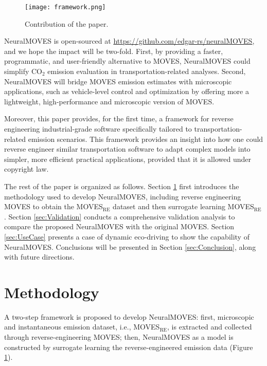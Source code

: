 \documentclass[12pt,english]{article}
\begin{document}
\begin{figure}
    \centering
    \texttt{[image: framework.png]}
    \caption{Contribution of the paper.}
    \label{fig:framework}
\end{figure}



NeuralMOVES is open-sourced at \url{https://github.com/edgar-rs/neuralMOVES}, and we hope the impact will be two-fold. 
First, by providing a faster, programmatic, and user-friendly alternative to MOVES, NeuralMOVES could simplify CO$_2$ emission evaluation in transportation-related analyses. 
Second, NeuralMOVES will bridge MOVES emission estimates with microscopic applications, such as vehicle-level control and optimization by offering more a lightweight, high-performance and microscopic version of MOVES.  


Moreover, this paper provides, for the first time, a framework for reverse engineering industrial-grade software specifically tailored to transportation-related emission scenarios. This framework provides an insight into how one could reverse engineer similar transportation software to adapt complex models into simpler, more efficient practical applications, provided that it is allowed under copyright law.



The rest of the paper is organized as follows. 
Section \ref{sec:Method} first introduces the methodology used to develop NeuralMOVES, including reverse engineering MOVES to obtain the MOVES$_\text{RE}$ dataset and then surrogate learning MOVES$_\text{RE}$.
Section \ref{sec:Validation} conducts a comprehensive validation analysis to compare the proposed NeuralMOVES with the original MOVES.
Section \ref{sec:UseCase} presents a case of dynamic eco-driving to show the capability of NeuralMOVES. 
Conclusions will be presented in Section \ref{sec:Conclusion}, along with future directions.







\section{Methodology}\label{sec:Method}

A two-step framework is proposed to develop NeuralMOVES: first, microscopic and instantaneous emission dataset, i.e., MOVES$_\text{RE}$, is extracted and collected through reverse-engineering MOVES; then, NeuralMOVES as a model is constructed by surrogate learning the reverse-engineered emission data (Figure \ref{fig:framework}).
\end{document}
